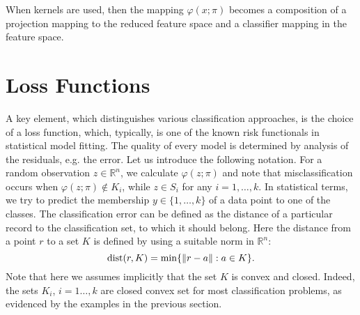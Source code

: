 \documentclass[10pt,letterpaper]{article}
\newcommand{\R}{\mathbb{R}}
\newcommand{\1}{1{\hskip -2.55 pt}\hbox{I}}
\newcommand{\dist}{\mathop{\rm dist}}
\begin{document}
When kernels are used, then the mapping $\varphi(x;\pi)$ becomes a composition of a projection mapping to the reduced feature space and a classifier mapping in the feature space.





\section{Loss Functions} %
\label{sec:loss_functions}

A key element, which distinguishes various classification approaches, is the choice of a loss function, which, typically, is one of the known risk functionals in statistical model fitting. The quality of every model is determined by analysis of the residuals, e.g. the error. Let us introduce the following notation. For a random observation $z\in\R^n$, we calculate $\varphi(z;\pi)$ and note that misclassification occurs when $\varphi(z;\pi)\not\in K_i$, while $z\in S_i$ for any $i=1,\dots, k$.
In statistical terms, we try to predict the membership $y\in\{1,\dots, k\}$ of a data point to one of the classes. 
The classification error can be defined as the distance of a particular record to the classification set, to which it should belong. 
Here the distance from a point $r$ to a set $K$ is defined by using a suitable norm in $\R^n$:
\[
\dist(r,K)  =\min\{ \|r-a\|: a\in K\}.
\]
Note that here we assumes implicitly that the set $K$ is convex and closed. Indeed, the sets $K_i$, $i=1\dots,k$ are closed convex set for most classification problems, as evidenced by the examples in the previous section.
\end{document}
